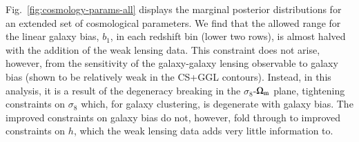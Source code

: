 Fig.~\ref{fig:cosmology-params-all} displays the marginal posterior distributions for an extended set of cosmological parameters.  
We find that the allowed range for the linear galaxy bias,  $b_1$, in each redshift bin (lower two rows), is almost halved with the addition of the weak lensing data. 
This constraint does not arise, however, from the sensitivity of the galaxy-galaxy lensing observable to galaxy bias (shown to be relatively weak in the CS+GGL contours). 
Instead, in this analysis, it is a result of the degeneracy breaking in the $\sigma_8$-$\Omega_{\rm m}$ plane, tightening constraints on $\sigma_8$ which, for galaxy clustering, is degenerate with galaxy bias. 
The improved constraints on galaxy bias do not, however, fold through to improved constraints on $h$, which the weak lensing data adds very little information to. 


